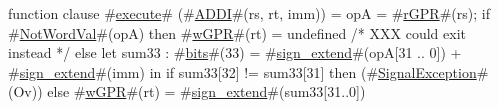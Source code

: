 function clause #\hyperref[zexecute]{execute}# (#\hyperref[zADDI]{ADDI}#(rs, rt, imm)) =
  {
    opA = #\hyperref[zrGPR]{rGPR}#(rs);
    if #\hyperref[zNotWordVal]{NotWordVal}#(opA) then
      #\hyperref[zwGPR]{wGPR}#(rt) = undefined /* XXX could exit instead */
    else
      let sum33 : #\hyperref[zbits]{bits}#(33) = #\hyperref[zsignzyextend]{sign\_extend}#(opA[31 .. 0]) + #\hyperref[zsignzyextend]{sign\_extend}#(imm) in
        if sum33[32] != sum33[31] then
          (#\hyperref[zSignalException]{SignalException}#(Ov))
        else
	  #\hyperref[zwGPR]{wGPR}#(rt) = #\hyperref[zsignzyextend]{sign\_extend}#(sum33[31..0])
  }
